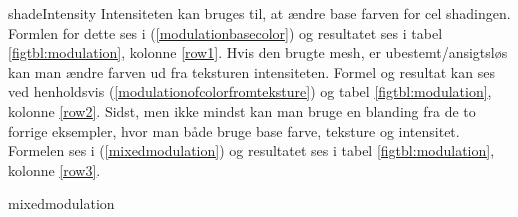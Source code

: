  {shadeIntensity} 
Intensiteten kan bruges til, at ændre base farven for cel shadingen. Formlen for dette ses i
(\ref{modulationbasecolor}) og resultatet ses i tabel \ref{figtbl:modulation}, kolonne \ref{row1}. 
Hvis den brugte mesh, er ubestemt/ansigtsløs kan man ændre farven ud fra teksturen
intensiteten. 
Formel og resultat kan ses ved henholdsvis
(\ref{modulationofcolorfromteksture}) og tabel \ref{figtbl:modulation}, kolonne \ref{row2}. Sidst,
men ikke mindst kan man bruge en blanding fra de to forrige eksempler, hvor man både bruge base
farve, teksture og intensitet. Formelen ses i (\ref{mixedmodulation}) og resultatet ses i tabel \ref{figtbl:modulation}, kolonne \ref{row3}.

 {mixedmodulation}

